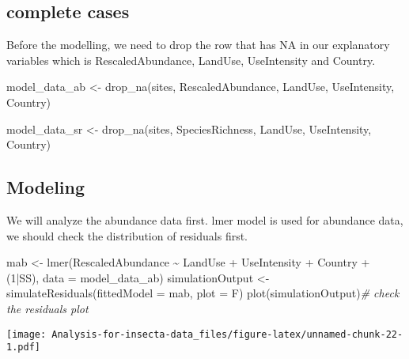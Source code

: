 \documentclass[
]{article}
\newenvironment{Shaded}{\begin{snugshade}}{\end{snugshade}}
\newcommand{\AttributeTok}[1]{\textcolor[rgb]{0.77,0.63,0.00}{#1}}
\newcommand{\CommentTok}[1]{\textcolor[rgb]{0.56,0.35,0.01}{\textit{#1}}}
\newcommand{\DecValTok}[1]{\textcolor[rgb]{0.00,0.00,0.81}{#1}}
\newcommand{\FunctionTok}[1]{\textcolor[rgb]{0.00,0.00,0.00}{#1}}
\newcommand{\NormalTok}[1]{#1}
\newcommand{\OtherTok}[1]{\textcolor[rgb]{0.56,0.35,0.01}{#1}}
\newcommand{\SpecialCharTok}[1]{\textcolor[rgb]{0.00,0.00,0.00}{#1}}
\begin{document}
\hypertarget{complete-cases}{%
\subsection{complete cases}\label{complete-cases}}

Before the modelling, we need to drop the row that has NA in our
explanatory variables which is RescaledAbundance, LandUse, UseIntensity
and Country.

\begin{Shaded}
\begin{Highlighting}[]
\NormalTok{model\_data\_ab }\OtherTok{\textless{}{-}} \FunctionTok{drop\_na}\NormalTok{(sites, }
\NormalTok{                         RescaledAbundance, LandUse,}
\NormalTok{                         UseIntensity, Country)}

\NormalTok{model\_data\_sr }\OtherTok{\textless{}{-}} \FunctionTok{drop\_na}\NormalTok{(sites, }
\NormalTok{                         SpeciesRichness, LandUse,}
\NormalTok{                         UseIntensity, Country)}
\end{Highlighting}
\end{Shaded}

\hypertarget{modeling}{%
\subsection{Modeling}\label{modeling}}

We will analyze the abundance data first. lmer model is used for
abundance data, we should check the distribution of residuals first.

\begin{Shaded}
\begin{Highlighting}[]
\NormalTok{mab }\OtherTok{\textless{}{-}} \FunctionTok{lmer}\NormalTok{(RescaledAbundance }\SpecialCharTok{\textasciitilde{}}\NormalTok{ LandUse }\SpecialCharTok{+}\NormalTok{ UseIntensity }\SpecialCharTok{+}\NormalTok{ Country }\SpecialCharTok{+}\NormalTok{ (}\DecValTok{1}\SpecialCharTok{|}\NormalTok{SS), }\AttributeTok{data =}\NormalTok{ model\_data\_ab)}
\NormalTok{simulationOutput }\OtherTok{\textless{}{-}}\FunctionTok{simulateResiduals}\NormalTok{(}\AttributeTok{fittedModel =}\NormalTok{ mab, }\AttributeTok{plot =}\NormalTok{ F)}
\FunctionTok{plot}\NormalTok{(simulationOutput)}\CommentTok{\# check the residuals plot}
\end{Highlighting}
\end{Shaded}

\texttt{[image: Analysis-for-insecta-data\_files/figure-latex/unnamed-chunk-22-1.pdf]}
\end{document}
